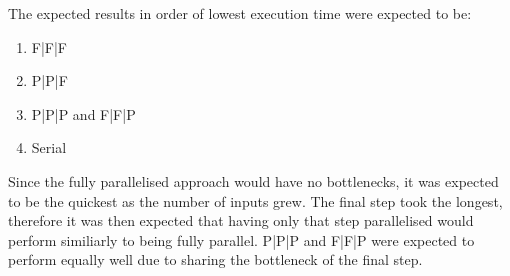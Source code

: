 \documentclass[12pt]{article}
\begin{document}
\begin{table}[]
\centering
{}
\caption{Configurations for experiment.}
\label{tbl:exp1}
\end{table}
\FloatBarrier

\noindent The expected results in order of lowest execution time were expected to be:
\begin{enumerate}
	\item F|F|F
	\item P|P|F
	\item P|P|P and F|F|P
	\item Serial
\end{enumerate}

Since the fully parallelised approach would have no bottlenecks, it was expected to be the quickest as the number of inputs grew. The final step took the longest, therefore it was then expected that having only that step parallelised would perform similiarly to being fully parallel. P|P|P and F|F|P were expected to perform equally well due to sharing the bottleneck of the final step. 
\end{document}
